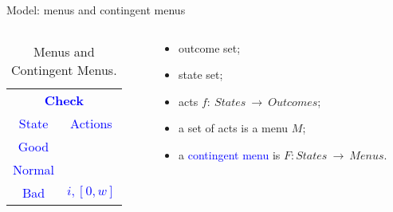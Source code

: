 \documentclass[usenames,dvipsnames,aspectratio=169,11pt, envcountsect, handout]{beamer}
\begin{document}
\begin{frame}[noframenumbering]{Model: menus and contingent menus}

	\begin{columns}
		\begin{column}{0.45\textwidth}  %
			\begin{center}

				\begin{table}[H]
					\centering
					\begin{tabular}{c | c}
						\multicolumn{2}{c}{\textcolor{blue}{\textbf{Check}}}                                                  \\
						\textcolor{blue}{State}  & \textcolor{blue}{Actions}                                                  \\
						\hline
						\textcolor{blue}{Good}   & \textcolor{blue}{\multirow{2}{*}{\( i, \left[ 0, \overline{w} \right] \)}} \\
						\textcolor{blue}{Normal} & \textcolor{blue}{}                                                         \\
						\textcolor{blue}{Bad}    & \textcolor{blue}{\( i, \left[0, w \right] \)}                              \\
					\end{tabular}
					\caption{Menus and Contingent Menus.}
					\label{tab:menus3}
				\end{table}
			\end{center}
		\end{column}

		\begin{column}{0.55\textwidth}  %
			\begin{itemize}
				\item outcome set;
				\item state set;
				\item acts \( f : \: States \: \rightarrow \: Outcomes \);
				\item a set of acts is a menu \( M \);
				\item a \textcolor{blue}{contingent menu} is \(F: States \: \rightarrow \: Menus \).
			\end{itemize}
		\end{column}
	\end{columns}

\end{frame}
\end{document}
